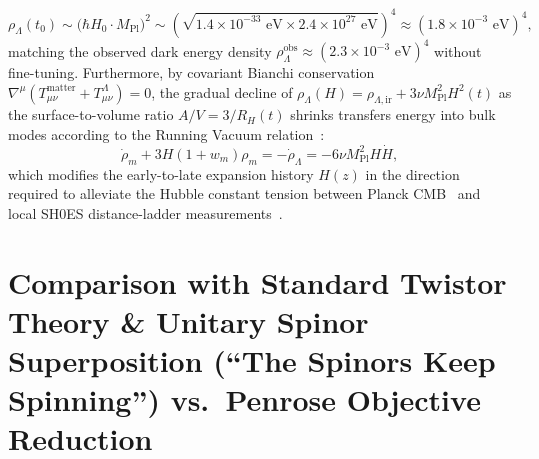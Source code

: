 \documentclass[11pt,a4paper]{article}
\begin{document}
\begin{equation}
\rho_\Lambda(t_0) \sim \big(\hbar H_0 \cdot M_{\text{Pl}}\big)^2 \sim \left( \sqrt{1.4 \times 10^{-33}\text{ eV} \times 2.4 \times 10^{27}\text{ eV}} \right)^4 \approx \left( 1.8 \times 10^{-3}\text{ eV} \right)^4,
\end{equation}
matching the observed dark energy density $\rho_\Lambda^{\text{obs}} \approx (2.3 \times 10^{-3}\text{ eV})^4$ without fine-tuning. Furthermore, by covariant Bianchi conservation $\nabla^\mu(T_{\mu\nu}^{\text{matter}} + T_{\mu\nu}^\Lambda) = 0$, the gradual decline of $\rho_\Lambda(H) = \rho_{\Lambda,\text{ir}} + 3\nu M_{\text{Pl}}^2 H^2(t)$ as the surface-to-volume ratio $A/V = 3/R_H(t)$ shrinks transfers energy into bulk modes according to the Running Vacuum relation~\cite{Sola2022,ShapiroSola2009}:
\begin{equation}
\dot{\rho}_m + 3H(1 + w_m)\rho_m = -\dot{\rho}_\Lambda = -6\nu M_{\text{Pl}}^2 H\dot{H},
\end{equation}
which modifies the early-to-late expansion history $H(z)$ in the direction required to alleviate the Hubble constant tension between Planck CMB~\cite{Planck2018} and local SH0ES distance-ladder measurements~\cite{Riess2022}.

\section{Comparison with Standard Twistor Theory \& Unitary Spinor Superposition (``The Spinors Keep Spinning'') vs.\ Penrose Objective Reduction}
\end{document}
